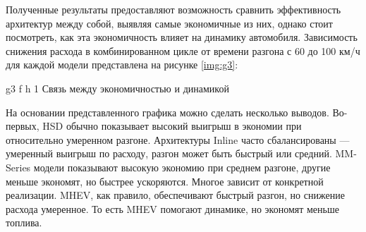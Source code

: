 \newpage

Полученные результаты предоставляют возможность сравнить эффективность архитектур между собой, выявляя самые экономичные из них, однако стоит посмотреть, как эта экономичность влияет на динамику автомобиля. Зависимость снижения расхода в комбинированном цикле от времени разгона с 60 до 100 км/ч для каждой модели представлена на рисунке \ref{img:g3}:

    {g3} %
    {f} %
    {h} %
    {1\textwidth} %
    {Связь между экономичностью и динамикой} %

На основании представленного графика можно сделать несколько выводов. Во-первых, HSD обычно показывает высокий выигрыш в экономии при относительно умеренном разгоне. Архитектуры Inline часто сбалансированы — умеренный выигрыш по расходу, разгон может быть быстрый или средний. MM-Series модели показывают высокую экономию при среднем разгоне, другие меньше экономят, но быстрее ускоряются. Многое зависит от конкретной реализации. MHEV, как правило, обеспечивают быстрый разгон, но снижение расхода умеренное. То есть MHEV помогают динамике, но экономят меньше топлива.